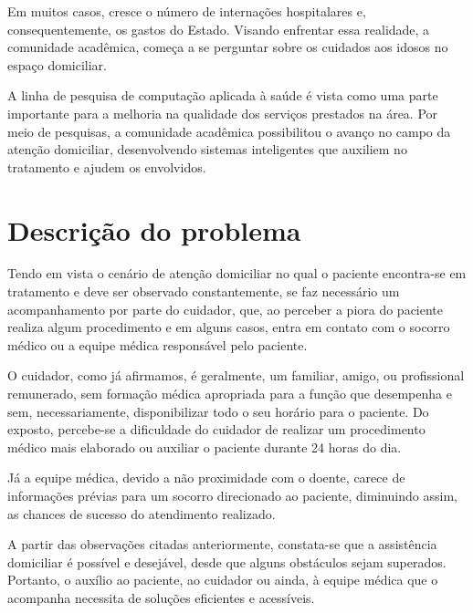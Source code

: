 Em muitos casos, cresce o número de internações hospitalares e,
consequentemente, os gastos do Estado. Visando enfrentar essa 
realidade, a comunidade acadêmica, %
começa a se perguntar sobre os cuidados aos idosos no espaço domiciliar.

A linha de pesquisa de computação aplicada à saúde é vista como uma parte
importante para a melhoria na qualidade dos serviços prestados na área. Por meio
de pesquisas, a comunidade acadêmica possibilitou o avanço no campo da atenção
domiciliar, desenvolvendo sistemas inteligentes que auxiliem no tratamento e
ajudem os envolvidos.

\section{Descrição do problema}\label{sec:descricao-problema}

Tendo em vista o cenário de atenção domiciliar no qual o paciente
encontra-se em tratamento e deve ser observado constantemente, 
se faz necessário um acompanhamento por parte do cuidador, que, ao perceber 
a piora do paciente realiza algum procedimento e em alguns casos, entra 
em contato com o socorro médico ou a equipe médica responsável pelo paciente.

O cuidador, como já afirmamos, é geralmente, um familiar, amigo, ou profissional
remunerado, sem formação médica apropriada para a função que desempenha  e sem,
necessariamente, disponibilizar todo o seu horário para o paciente. Do exposto,
percebe-se a dificuldade do cuidador de realizar um procedimento médico mais
elaborado ou auxiliar o paciente durante 24 horas do dia.

Já a equipe médica, devido a não proximidade com o doente, carece de informações
prévias para um socorro direcionado ao paciente, diminuindo assim, as chances de
sucesso do atendimento realizado.


A partir das observações citadas anteriormente, constata-se que a assistência
domiciliar é possível e desejável, desde que alguns obstáculos sejam superados.
Portanto, o auxílio ao paciente, ao cuidador ou ainda, à equipe médica que o
acompanha necessita de soluções eficientes e acessíveis.

